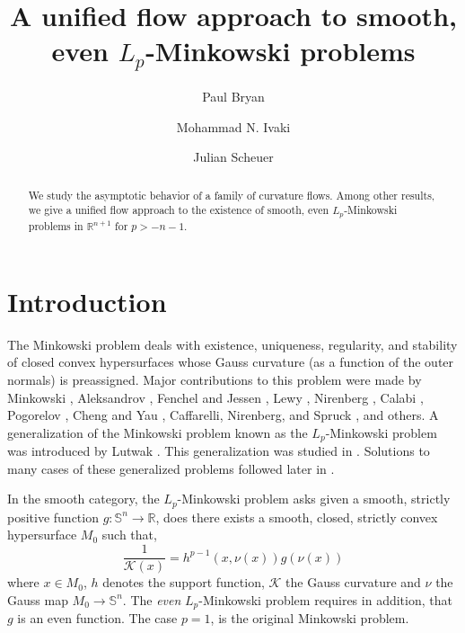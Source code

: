 \documentclass{amsart}
\theoremstyle{definition}
\theoremstyle{remark}
\numberwithin{equation}{section}
\begin{document}
\title[]
 {A unified flow approach to smooth, even $L_p$-Minkowski problems}

\author[P. Bryan]{Paul Bryan}
\address{Mathematics Institute, University of Warwick
Coventry, CV4 7AL, England}
\author[M.N. Ivaki]{Mohammad N. Ivaki}
\address{Institut f\"{u}r Diskrete Mathematik und Geometrie, Technische Universit\"{a}t Wien,
Wiedner Hauptstr. 8--10, 1040 Wien, Austria}
\author[J. Scheuer]{Julian Scheuer}
\address{Albert-Ludwigs-Universit\"{a}t,
Mathematisches Institut, Eckerstr. 1, 79104
Freiburg, Germany}
\dedicatory{}
\subjclass[2010]{}
\keywords{}

\begin{abstract}
We study the asymptotic behavior of a family of curvature flows. Among other results, we give a unified flow approach to the existence of smooth, even $L_p$-Minkowski problems in $\mathbb{R}^{n+1}$ for $p>-n-1.$
\end{abstract}

\maketitle
\section{Introduction}
The Minkowski problem deals with existence, uniqueness, regularity, and stability of closed convex hypersurfaces whose Gauss curvature (as a function of the outer normals) is preassigned. Major contributions to this problem were made by Minkowski \cite{M1,M2}, Aleksandrov \cite{A2,A3,A4}, Fenchel and Jessen \cite{FJ}, Lewy \cite{Le1,Le2}, Nirenberg \cite{N}, Calabi \cite{Cal}, Pogorelov \cite{P1,P2}, Cheng and Yau \cite{ChYau}, Caffarelli, Nirenberg, and Spruck \cite{CNS}, and others. A generalization of the Minkowski problem known as the $L_p$-Minkowski problem was introduced by Lutwak \cite{Lu1,Lu2}. This generalization was studied in \cite{Lu1,LuO}. Solutions to many cases of these generalized problems followed later in \cite{1,AnCrys,Andrews Ben 2000,Andrews 2003,27,36,39,49,50,51,72,LYZ,79,104,110,s1,s2,Zhu1,Zhu2,Zhu3,jiang,QL,DZ}.

In the smooth category, the $L_p$-Minkowski problem asks given a smooth, strictly positive function $g : \mathbb{S}^n \to \mathbb{R}$, does there exists a smooth, closed, strictly convex hypersurface $M_0$ such that,
\begin{equation}
\label{e:lp}
\frac{1}{\mathcal{K}(x)} = h^{p-1}(x, \nu(x)) g(\nu(x))
\end{equation}
where $x \in M_0$, $h$ denotes the support function, $\mathcal{K}$ the Gauss curvature and $\nu$ the Gauss map $M_0 \to \mathbb{S}^n$. The \emph{even} $L_p$-Minkowski problem requires in addition, that $g$ is an even function. The case $p=1$, is the original Minkowski problem.
\end{document}
